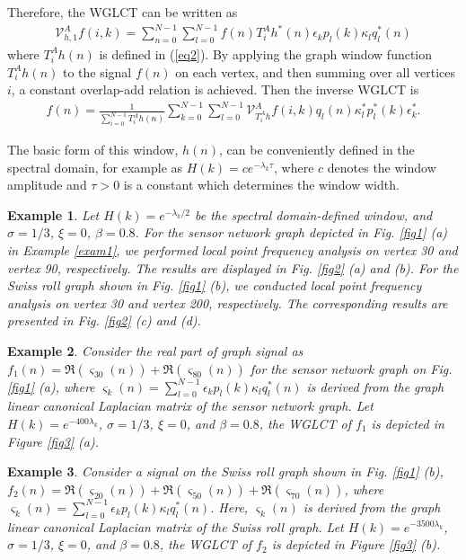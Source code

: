 \documentclass[lettersize,journal]{IEEEtran}
\newtheorem{example}{Example}
\begin{document}
Therefore, the WGLCT can be written as 
\begin{align}
	\mathcal{V}_{h,1}^Af(i,k)
	= \sum_{n=0}^{N-1} \sum_{l=0}^{N-1} f(n) T_i^A h^*(n) \epsilon_k p_l(k) \kappa_l q_l^*(n)
\end{align}
where $T_i^A h(n)$ is defined in (\ref{eq2}).
By applying the graph window function $T_i^A h(n)$ to the signal $f(n)$ on each vertex, and then summing over all vertices $i$, a constant overlap-add relation is achieved. Then the inverse WGLCT is
\begin{align}
	f(n) 
	= \frac{1}{\sum_{i=0}^{N-1}T_i^A h(n)}\sum_{k=0}^{N-1} \sum_{l=0}^{N-1} \mathcal{V}_{T_i^A h}^Af(i,k)
	q_l(n) \kappa_l^{*} p_l^*(k) \epsilon_k^{*}.
\end{align}

The basic form of this window, $h(n)$, can be conveniently defined in the spectral domain, for example as
$H(k) = c e^{-\lambda_k \tau}$,
where $c$ denotes the window amplitude and $\tau > 0$ is a constant which determines the window width. 


\begin{example} \label{exam4}
	 Let $H(k) = e^{-\lambda_k/2}$ be the spectral domain-defined window, and $\sigma=1/3$, $\xi=0$, $\beta=0.8$. For the sensor network graph depicted in Fig. \ref{fig1} (a) in Example \ref{exam1}, we performed local point frequency analysis on vertex 30 and vertex 90, respectively. The results are displayed in Fig. \ref{fig2} (a) and (b). For the Swiss roll graph shown in Fig. \ref{fig1} (b), we conducted local point frequency analysis on vertex 30 and vertex 200, respectively. The corresponding results are presented in Fig. \ref{fig2} (c) and (d).
\end{example}


\begin{example} \label{exam5}
	Consider the real part of graph signal as $f_1(n)={\Re}(\varsigma_{30}(n)) + {\Re}(\varsigma_{80}(n))$
	for the sensor network graph on Fig. \ref{fig1} (a), where $\varsigma_{k}(n)=\sum_{l=0}^{N-1} \epsilon_{k} p_l(k) \kappa_l q_l^*(n)$ is derived from the graph linear canonical Laplacian matrix of the sensor network graph. Let $H(k) = e^{-400\lambda_k}$, $\sigma=1/3$, $\xi=0$, and $\beta=0.8$, the WGLCT of $f_1$ is depicted in Figure \ref{fig3} (a). 
\end{example}
\begin{example}
	Consider a signal on the Swiss roll graph shown in Fig. \ref{fig1} (b), $f_2(n)={\Re}(\varsigma_{20}(n)) + {\Re}(\varsigma_{50}(n))+{\Re}(\varsigma_{70}(n))$, where $\varsigma_{k}(n)=\sum_{l=0}^{N-1} \epsilon_{k} p_l(k) \kappa_l q_l^*(n)$. Here, $\varsigma_{k}(n)$ is derived from the graph linear canonical Laplacian matrix of the Swiss roll graph.
	Let $H(k) = e^{-3500\lambda_k}$, $\sigma=1/3$, $\xi=0$, and $\beta=0.8$, the WGLCT of $f_2$ is depicted in Figure \ref{fig3} (b). 
\end{example}
\end{document}
